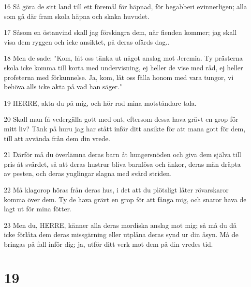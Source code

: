 \par 16 Så göra de sitt land till ett föremål för häpnad, för begabberi evinnerligen; alla som gå där fram skola häpna och skaka huvudet.
\par 17 Såsom en östanvind skall jag förskingra dem, när fienden kommer; jag skall visa dem ryggen och icke ansiktet, på deras ofärds dag..
\par 18 Men de sade: "Kom, låt oss tänka ut något anslag mot Jeremia. Ty prästerna skola icke komma till korta med undervisning, ej heller de vise med råd, ej heller profeterna med förkunnelse. Ja, kom, låt oss fälla honom med vara tungor, vi behöva alls icke akta på vad han säger."
\par 19 HERRE, akta du på mig, och hör rad mina motståndare tala.
\par 20 Skall man få vedergälla gott med ont, eftersom dessa hava grävt en grop för mitt liv? Tänk på huru jag har stått inför ditt ansikte för att mana gott för dem, till att avvända från dem din vrede.
\par 21 Därför må du överlämna deras barn åt hungersnöden och giva dem själva till pris åt svärdet, så att deras hustrur bliva barnlösa och änkor, deras män dräpta av pesten, och deras ynglingar slagna med svärd striden.
\par 22 Må klagorop höras från deras hus, i det att du plötsligt låter rövarskaror komma över dem. Ty de hava grävt en grop för att fånga mig, och snaror hava de lagt ut för mina fötter.
\par 23 Men du, HERRE, känner alla deras mordiska anslag mot mig; så må du då icke förlåta dem deras missgärning eller utplåna deras synd ur din åsyn. Må de bringas på fall inför dig; ja, utför ditt verk mot dem på din vredes tid.

\chapter{19}

